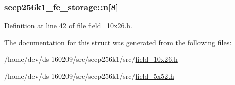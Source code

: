 \subsubsection[{n}]{ secp256k1\+\_\+fe\+\_\+storage\+::n\mbox{[}8\mbox{]}}\label{structsecp256k1__fe__storage_a63f0548b6674a57ab1d2c6271008c037}


Definition at line 42 of file field\+\_\+10x26.\+h.



The documentation for this struct was generated from the following files\+:\begin{DoxyCompactItemize}
\item 
/home/dev/ds-\/160209/src/secp256k1/src/\hyperlink{field__10x26_8h}{field\+\_\+10x26.\+h}\item 
/home/dev/ds-\/160209/src/secp256k1/src/\hyperlink{field__5x52_8h}{field\+\_\+5x52.\+h}\end{DoxyCompactItemize}

